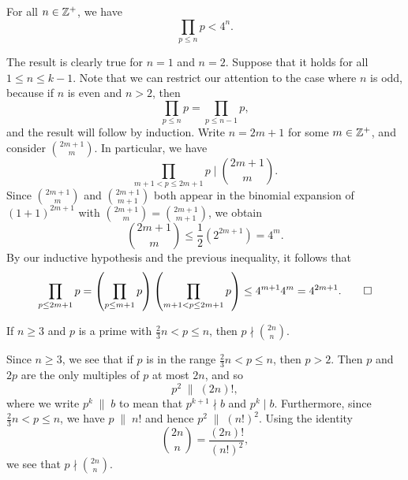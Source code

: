 \begin{prop}\label{prop:1.14}
For all $n \in \mathbb{Z}^+$, we have 
\[ \prod_{p\leq n} p < 4^n. \]
\end{prop}
\begin{pf}
The result is clearly true for $n = 1$ and $n = 2$. Suppose that it holds for all $1 \leq n \leq k-1$. 
Note that we can restrict our attention to the case where $n$ is odd, because if $n$ is even 
and $n > 2$, then 
\[ \prod_{p \leq n} p = \prod_{p \leq n-1} p, \]
and the result will follow by induction. Write $n = 2m+1$ for some $m \in \mathbb{Z}^+$, and consider 
$\binom{2m+1}m$. In particular, we have 
\[ \prod_{m+1<p\leq2m+1} p \; \bigg\rvert \; \binom{2m+1}m. \]
Since $\binom{2m+1}m$ and $\binom{2m+1}{m+1}$ both appear in the binomial expansion of $(1+1)^{2m+1}$
with $\binom{2m+1}m = \binom{2m+1}{m+1}$, we obtain 
\[ \binom{2m+1}m \leq \frac12 (2^{2m+1}) = 4^m. \]
By our inductive hypothesis and the previous inequality, it follows that 
\[ \prod_{p\leq 2m+1} p = \left( \prod_{p\leq m+1} p \right) \left( \prod_{m+1 < p\leq 2m+1} p \right)
\leq 4^{m+1} 4^m = 4^{2m+1}. \qedhere \]
\end{pf}

\begin{lemma}\label{lemma:1.15}
If $n \geq 3$ and $p$ is a prime with $\frac23n < p \leq n$, then $p \nmid \binom{2n}n$. 
\end{lemma}
\begin{pf}
Since $n \geq 3$, we see that if $p$ is in the range $\frac23n < p \leq n$, then $p > 2$. Then 
$p$ and $2p$ are the only multiples of $p$ at most $2n$, and so 
\[ p^2 \; \| \; (2n)!, \]
where we write $p^k \; \| \; b$ to mean that $p^{k+1} \nmid b$ and $p^k \mid b$. Furthermore, since 
$\frac23n < p \leq n$, we have $p \;\|\; n!$ and hence $p^2 \;\|\; (n!)^2$. Using the identity 
\[ \binom{2n}n = \frac{(2n)!}{(n!)^2}, \] we see that $p \nmid \binom{2n}n$. 
\end{pf}


